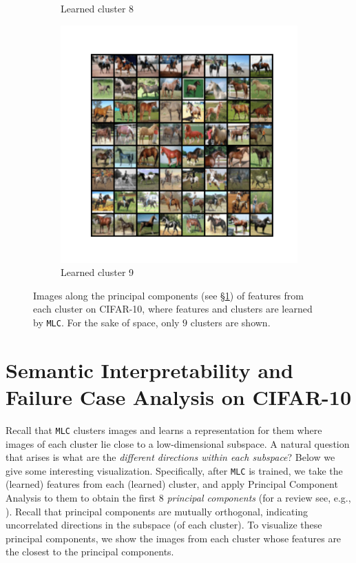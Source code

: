 \documentclass[10pt,twocolumn,letterpaper]{article}
\newcommand{\ours}{MLC}
\newcommand{\mours}{\texttt{\ours}}
\begin{document}
\begin{figure}
\begin{subfigure}{0.32\textwidth}
       \caption{Learned cluster 8}
       \label{fig:cifar10-8}
     \end{subfigure}
     \hfill
     \begin{subfigure}{0.32\textwidth}
       \includegraphics[width=\linewidth,trim={2cm 2cm 2cm 2cm},clip]{figures/experiments/cifar10_cluster/nearest_class8.png}
       \caption{Learned cluster 9}
       \label{fig:cifar10-9}
     \end{subfigure}
     \caption{Images along the principal components (see \S \ref{sec:semantic}) of features from each cluster on CIFAR-10, where features and clusters are learned by \mours{}. For the sake of space, only $9$ clusters are shown. }
     \label{fig:cifar10-pc}
   \end{figure}
   
   \clearpage
   
   \section{Semantic Interpretability and Failure Case Analysis on CIFAR-10 }\label{sec:semantic}
   Recall that \mours{} clusters images and learns a representation for them where images of each cluster lie close to a low-dimensional subspace. A natural question that arises is what are the \textit{different directions within each subspace}? Below we give some interesting visualization. Specifically, after \mours{} is trained, we take the (learned) features from each (learned) cluster, and apply Principal Component Analysis to them to obtain the first $8$ \textit{principal components} (for a review see, e.g., \cite[\S 2.1]{Vidal2016-zp}). Recall that principal components are mutually orthogonal, indicating uncorrelated directions in the subspace (of each cluster). To visualize these principal components, we show the images from each cluster whose features are the closest to the principal components. 
   
\end{document}
